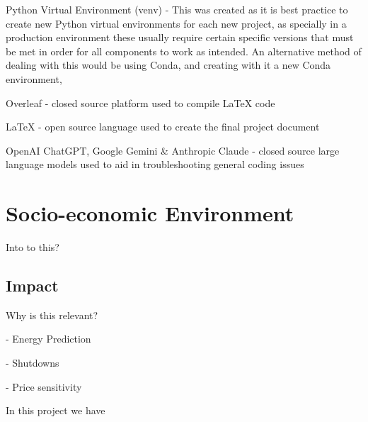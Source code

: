 \documentclass[12pt]{report} %
\begin{document}
Python Virtual Environment (venv) - This was created as it is best practice to create new Python virtual environments for each new project, as specially in a production environment these usually require certain specific versions that must be met in order for all components to work as intended. An alternative method of dealing with this would be using Conda, and creating with it a new Conda environment, \cite{python_venv}

Overleaf - closed source platform used to compile LaTeX code \cite{overleaf}

LaTeX - open source language used to create the final project document \cite{latex}

OpenAI ChatGPT, Google Gemini \& Anthropic Claude - closed source large language models used to aid in troubleshooting general coding issues



\chapter{Socio-economic Environment}
Into to this?


\section{Impact}

Why is this relevant?

- Energy Prediction

- Shutdowns

- Price sensitivity

In this project we have

\end{document}
